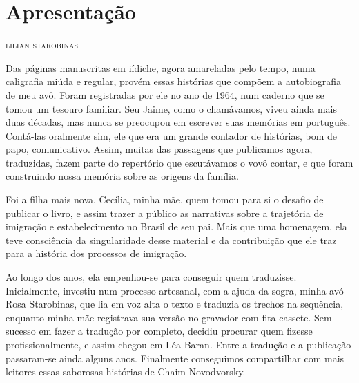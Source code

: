 \chapter*{Apresentação\smallskip{}}

\begin{flushright}
\textsc{lilian starobinas}
\end{flushright}

\noindent{}Das páginas manuscritas em iídiche, agora amareladas pelo tempo, numa
caligrafia miúda e regular, provém essas histórias que compõem a
autobiografia de meu avô. Foram registradas por ele no ano de 1964, num
caderno que se tomou um tesouro familiar. Seu Jaime, como o chamávamos,
viveu ainda mais duas décadas, mas nunca se preocupou em escrever suas
memórias em português. Contá-las oralmente sim, ele que era um grande
contador de histórias, bom de papo, comunicativo. Assim, muitas das
passagens que publicamos agora, traduzidas, fazem parte do repertório que
escutávamos o vovô contar, e que foram construindo nossa memória sobre
as origens da família.


Foi a filha mais nova, Cecília, minha mãe, quem tomou para si o desafio
de publicar o livro, e assim trazer a público as narrativas sobre a
trajetória de imigração e estabelecimento no Brasil de seu pai. Mais que
uma homenagem, ela teve consciência da singularidade desse material e da
contribuição que ele traz para a história dos processos de imigração.

Ao longo dos anos, ela empenhou-se para conseguir quem traduzisse.
Inicialmente, investiu num processo artesanal, com a ajuda da sogra,
minha avó Rosa Starobinas, que lia em voz alta o texto e traduzia os
trechos na sequência, enquanto minha mãe registrava sua versão no
gravador com fita cassete. Sem sucesso em fazer a tradução por completo,
decidiu procurar quem fizesse profissionalmente, e assim chegou em Léa
Baran. Entre a tradução e a publicação passaram-se ainda alguns anos.
Finalmente conseguimos compartilhar com mais leitores essas saborosas
histórias de Chaim Novodvorsky.


